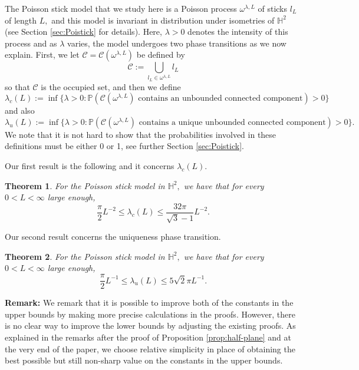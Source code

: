 \documentclass[a4paper,12pt]{article}
\newcommand{\BH}{{\mathbb{H}}}
\newcommand{\BP}{{\mathbb{P}}}
\newcommand{\CC}{{\mathcal{C}}}
\newtheorem{theorem}{Theorem}[section]
\begin{document}
The Poisson stick model that we study here is a Poisson process $\omega^{\lambda,L}$ of sticks 
$l_L$ of length $L,$ and this model
is invariant in distribution under isometries of $\BH^2$ (see Section \ref{sec:Poistick} for details).
Here, $\lambda>0$ denotes the intensity of this process and as $\lambda$ varies, the model 
undergoes two phase transitions as we now explain. First, we let $\CC=\CC(\omega^{\lambda,L})$ be defined 
by
\begin{equation} \label{eqn:CCdef}
\CC:=\bigcup_{l_L\in \omega^{\lambda,L}} l_L
\end{equation}
so that $\CC$ is the occupied set, and then we define 
\begin{equation} \label{eqn:deflambdac}
\lambda_c(L)
:=\inf\{\lambda>0: \BP(\CC(\omega^{\lambda,L}) 
\textrm{ contains an unbounded connected component})>0\}
\end{equation}
and also 
\begin{equation} \label{eqn:deflambdau}
\lambda_u(L) 
:=\inf\{\lambda>0: \BP(\CC(\omega^{\lambda,L}) 
\textrm{ contains a unique unbounded connected component})>0\}. 
\end{equation}
We note that it is not hard to show that the probabilities involved in these definitions must be either 
0 or 1, see further Section \ref{sec:Poistick}.

Our first result is the following and it concerns $\lambda_c(L).$
\begin{theorem} \label{thm:lambdacmain}
For the Poisson stick model in $\BH^2,$ we have that 
for every $0<L<\infty$ large enough,
\[
\frac{\pi}{2}L^{-2} \leq  \lambda_c(L) \leq \frac{32 \pi}{\sqrt{3}-1} L^{-2}.
\]
\end{theorem}
Our second result concerns the uniqueness phase transition.
\begin{theorem} \label{thm:lambdaumain}
For the Poisson stick model in $\BH^2,$ we have that 
for every $0<L<\infty$ large enough,
\[
\frac{\pi}{2} L^{-1} \leq  \lambda_u(L) \leq 5\sqrt{2} \pi L^{-1}.
\]
\end{theorem}
\noindent
{\bf Remark:}  We remark that it is possible to improve both of 
the constants in the upper 
bounds by making more precise calculations in the proofs. However, there is no clear
way to improve the lower bounds by adjusting the existing proofs. As explained in the 
remarks after the proof of Proposition \ref{prop:half-plane} and at the very end of 
the paper, we choose relative simplicity in place of obtaining the best possible
but still non-sharp value on the constants in the upper bounds.
\end{document}
